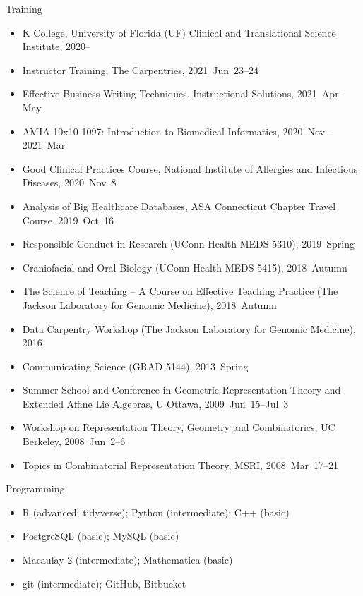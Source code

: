 \documentclass[10pt,a4paper]{article}
\begin{document}
\vspace{.25cm}
{\sc Training}
\begin{itemize}[label=$\circ$,nolistsep]
\item
K College, University of Florida (UF) Clinical and Translational Science Institute, 2020--
\item
Instructor Training, The Carpentries, 2021~Jun~23--24
\item
Effective Business Writing Techniques, Instructional Solutions, 2021~Apr--May
\item
AMIA 10x10 1097: Introduction to Biomedical Informatics, 2020~Nov--2021~Mar
\item
Good Clinical Practices Course, National Institute of Allergies and Infectious Diseases, 2020~Nov~8
\item
Analysis of Big Healthcare Databases, ASA Connecticut Chapter Travel Course, 2019~Oct~16
\item
Responsible Conduct in Research (UConn Health MEDS 5310), 2019~Spring
\item
Craniofacial and Oral Biology (UConn Health MEDS 5415), 2018~Autumn
\item
The Science of Teaching -- A Course on Effective Teaching Practice (The Jackson Laboratory for Genomic Medicine), 2018~Autumn
\item
Data Carpentry Workshop (The Jackson Laboratory for Genomic Medicine), 2016
\item
Communicating Science (GRAD 5144), 2013~Spring
\item
Summer School and Conference in Geometric Representation Theory and Extended Affine Lie Algebras, U Ottawa, 2009~Jun~15--Jul~3
\item
Workshop on Representation Theory, Geometry and Combinatorics, UC Berkeley, 2008~Jun~2--6
\item
Topics in Combinatorial Representation Theory, MSRI, 2008~Mar~17--21
\end{itemize}
%
\vspace{.25cm}
{\sc Programming}
\begin{itemize}[label=$\circ$,nolistsep]
\item R (advanced; tidyverse); Python (intermediate); C++ (basic)
\item PostgreSQL (basic); MySQL (basic)
\item Macaulay 2 (intermediate); Mathematica (basic)
\item git (intermediate); GitHub, Bitbucket
\end{itemize}
\end{document}
